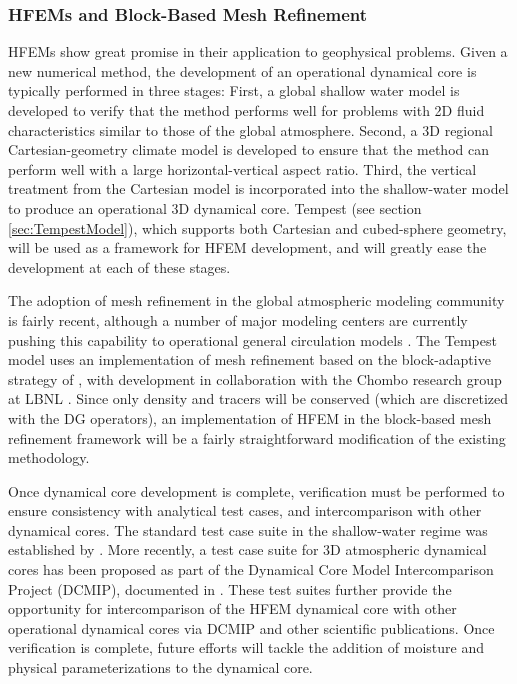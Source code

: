 \documentclass[11pt]{article}
\begin{document}
\subsubsection{HFEMs and Block-Based Mesh Refinement} \label{sec:HorizontalHFEM}

HFEMs show great promise in their application to geophysical problems.  Given a new numerical method, the development of an operational dynamical core is typically performed in three stages:  First, a global shallow water model is developed to verify that the method performs well for problems with 2D fluid characteristics similar to those of the global atmosphere.  Second, a 3D regional Cartesian-geometry climate model is developed to ensure that the method can perform well with a large horizontal-vertical aspect ratio.  Third, the vertical treatment from the Cartesian model is incorporated into the shallow-water model to produce an operational 3D dynamical core.  Tempest (see section \ref{sec:TempestModel}), which supports both Cartesian and cubed-sphere geometry, will be used as a framework for HFEM development, and will greatly ease the development at each of these stages.

The adoption of mesh refinement in the global atmospheric modeling community is fairly recent, although a number of major modeling centers are currently pushing this capability to operational general circulation models \citep{WCSJBKMGDLDFSHPTDR2012MWR, LMHSJL2013MWR, CMZCJMAT2013MWR}.  The Tempest model uses an implementation of mesh refinement based on the block-adaptive strategy of \cite{MJBPC1989JCP}, with development in collaboration with the Chombo research group at LBNL \citep{ChomboDesign}.  Since only density and tracers will be conserved (which are discretized with the DG operators), an implementation of HFEM in the block-based mesh refinement framework will be a fairly straightforward modification of the existing methodology.

Once dynamical core development is complete, verification must be performed to ensure consistency with analytical test cases, and intercomparison with other dynamical cores.  The standard test case suite in the shallow-water regime was established by \cite{WDHJS1992JCP}.  More recently, a test case suite for 3D atmospheric dynamical cores has been proposed as part of the Dynamical Core Model Intercomparison Project (DCMIP), documented in \cite{DCMIP2012TESTCASES}.  These test suites further provide the opportunity for intercomparison of the HFEM dynamical core with other operational dynamical cores via DCMIP and other scientific publications.  Once verification is complete, future efforts will tackle the addition of moisture and physical parameterizations to the dynamical core.
\end{document}
